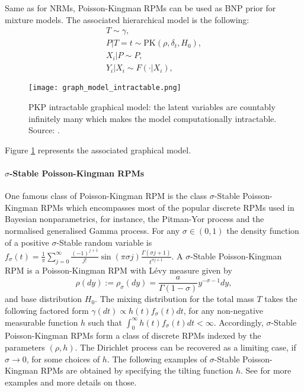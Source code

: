 Same as for \glspl{NRM}, Poisson-Kingman \glspl{RPM} can be used as \gls{BNP} prior for mixture models. The associated hierarchical model is the following:
\begin{gather*}
T \sim \gamma, \\
P|T=t \sim \text{PK}(\rho, \delta_t, H_0), \\
X_i|P \sim P, \\
Y_i|X_i \sim F(\cdot|X_i),
\end{gather*}

\begin{figure}[h!]
\centering
    \texttt{[image: graph\_model\_intractable.png]} 
    \caption{\gls{PKP} intractable graphical model: the latent variables are countably infinitely many which makes the model computationally intractable. Source: \cite{LomeliThesis}.} 
    \label{fig:graph_model_intractable} 
\end{figure}
Figure \ref{fig:graph_model_intractable} represents the associated graphical model.

\paragraph{$\sigma$-Stable Poisson-Kingman \glspl{RPM}}
One famous class of Poisson-Kingman \gls{RPM} is the class $\sigma$-Stable Poisson-Kingman \glspl{RPM} which encompasses most of the popular discrete \glspl{RPM} used in Bayesian nonparametrics, for instance, the Pitman-Yor process and the normalised generalised Gamma process.
For any $\sigma \in (0,1)$ the density function of a positive  $\sigma$-Stable random variable is
$f_\sigma(t) = \frac{1}{\pi}\sum_{j=0}^\infty \frac{(-1)^{j+1}}{j!}\sin(\pi\sigma j)\frac{\Gamma(\sigma j+1)}{t^{\sigma j+1}}$. A $\sigma$-Stable Poisson-Kingman \gls{RPM} is a Poisson-Kingman \gls{RPM} with Lévy measure given by
\begin{equation} \label{eq:sigma_stable_PK}
\rho(dy) := \rho_\sigma(dy) = \frac{a}{\Gamma(1 - \sigma)}y^{-\sigma-1} dy,
\end{equation}
and base distribution $H_0$.
The mixing distribution for the total mass $T$ takes the following factored form
$\gamma(dt) \propto h(t) f_\sigma(t) dt$, for any non-negative measurable function $h$ such that
$\int_0^\infty{h(t)f_\sigma(t) dt} < \infty$.
Accordingly, $\sigma$-Stable Poisson-Kingman \glspl{RPM} form a class of discrete \glspl{RPM} indexed by the parameters $(\rho, h)$. The Dirichlet process can be recovered as a limiting case, if $\sigma \rightarrow 0$, for some choices of $h$. The following examples of $\sigma$-Stable Poisson-Kingman \glspl{RPM}  are obtained by specifying the tilting function $h$. See \cite{LomeliThesis} for more examples and more details on those.

